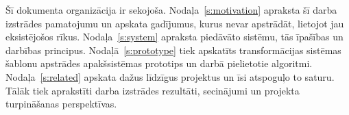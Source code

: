 
Šī dokumenta organizācija ir sekojoša. Nodaļa~\ref{s:motivation} apraksta šī darba izstrādes pamatojumu un apskata gadījumus, kurus nevar apstrādāt, lietojot jau eksistējošos rīkus. Nodaļa~\ref{s:system} apraksta piedāvāto sistēmu, tās īpašības un darbības principus. Nodaļā~\ref{s:prototype} tiek apskatīts transformācijas sistēmas šablonu apstrādes apakšsistēmas prototips un darbā pielietotie algoritmi. Nodaļa~\ref{s:related} apskata dažus līdzīgus projektus un īsi atspoguļo to saturu. Tālāk tiek aprakstīti darba izstrādes rezultāti, secinājumi un projekta turpināšanas perspektīvas.
